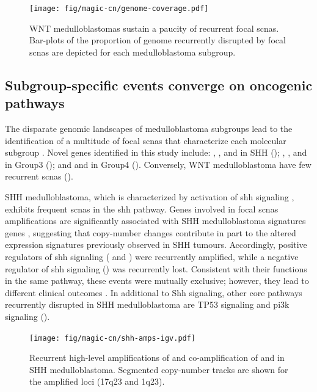 \begin{figure}
	\centering
	\texttt{[image: fig/magic-cn/genome-coverage.pdf]}
	\caption[WNT medulloblastomas sustain a paucity of recurrent focal \gls{scnas}.]
	{
		WNT medulloblastomas sustain a paucity of recurrent focal \gls{scnas}.
		Bar-plots of the proportion of genome recurrently disrupted by focal \gls{scnas} are depicted for each medulloblastoma subgroup.
	}
	\label{fig:genome-coverage}
\end{figure}

\subsection{Subgroup-specific events converge on oncogenic pathways}

The disparate genomic landscapes of medulloblastoma subgroups lead to the identification of a multitude of focal \gls{scnas} that characterize each molecular subgroup . Novel genes identified in this study include: , , and  in SHH (); , , and  in Group3 (); and  and  in Group4 (). Conversely, WNT medulloblastoma have few recurrent \gls{scnas} (). 

\clearpage

SHH medulloblastoma, which is characterized by activation of \gls{shh} signaling , exhibits frequent \gls{scnas} in the \gls{shh} pathway. Genes involved in focal \gls{scnas} amplifications are significantly associated with SHH medulloblastoma signatures genes , suggesting that copy-number changes contribute in part to the altered expression signatures previously observed in SHH tumours. Accordingly, positive regulators of \gls{shh} signaling ( and ) were recurrently amplified, while a negative regulator of \gls{shh} signaling () was recurrently lost. Consistent with their functions in the same pathway, these events were mutually exclusive; however, they lead to different clinical outcomes . In additional to Shh signaling, other core pathways recurrently disrupted in SHH medulloblastoma are TP53 signaling and \gls{pi3k} signaling ().

\begin{figure}
	\centering
	\texttt{[image: fig/magic-cn/shh-amps-igv.pdf]}
	\caption[Recurrent amplifications of , , and  in SHH medulloblastoma]
	{
		Recurrent high-level amplifications of  and co-amplification of  and  in SHH medulloblastoma.
		Segmented copy-number tracks are shown for the amplified loci (17q23 and 1q23).
	}
	\label{fig:shh-amps-igv}
\end{figure}

